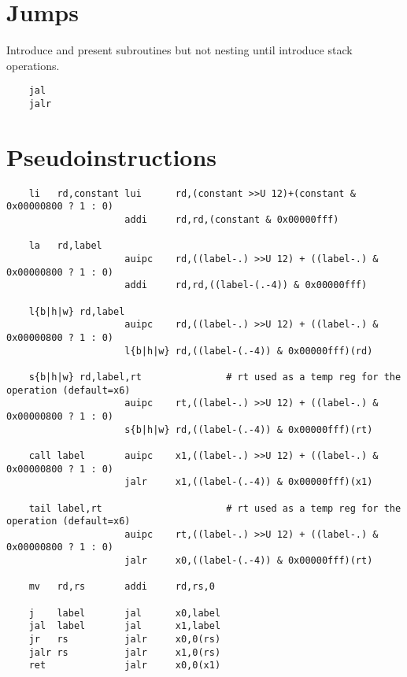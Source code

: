 \section{Jumps}

Introduce and present subroutines but not nesting until introduce stack operations.

\label{uguide:jal}
\label{uguide:jalr}
{\small
\begin{verbatim}
    jal
    jalr
\end{verbatim}
}



\section{Pseudoinstructions}

{\small
\begin{verbatim}
    li   rd,constant lui      rd,(constant >>U 12)+(constant & 0x00000800 ? 1 : 0)
                     addi     rd,rd,(constant & 0x00000fff)

    la   rd,label
                     auipc    rd,((label-.) >>U 12) + ((label-.) & 0x00000800 ? 1 : 0)
                     addi     rd,rd,((label-(.-4)) & 0x00000fff)

    l{b|h|w} rd,label
                     auipc    rd,((label-.) >>U 12) + ((label-.) & 0x00000800 ? 1 : 0)
                     l{b|h|w} rd,((label-(.-4)) & 0x00000fff)(rd)

    s{b|h|w} rd,label,rt               # rt used as a temp reg for the operation (default=x6)
                     auipc    rt,((label-.) >>U 12) + ((label-.) & 0x00000800 ? 1 : 0)
                     s{b|h|w} rd,((label-(.-4)) & 0x00000fff)(rt)

    call label       auipc    x1,((label-.) >>U 12) + ((label-.) & 0x00000800 ? 1 : 0)
                     jalr     x1,((label-(.-4)) & 0x00000fff)(x1)

    tail label,rt                      # rt used as a temp reg for the operation (default=x6)
                     auipc    rt,((label-.) >>U 12) + ((label-.) & 0x00000800 ? 1 : 0)
                     jalr     x0,((label-(.-4)) & 0x00000fff)(rt)

    mv   rd,rs       addi     rd,rs,0
 
    j    label       jal      x0,label
    jal  label       jal      x1,label
    jr   rs          jalr     x0,0(rs)
    jalr rs          jalr     x1,0(rs)
    ret              jalr     x0,0(x1)
\end{verbatim}
}

